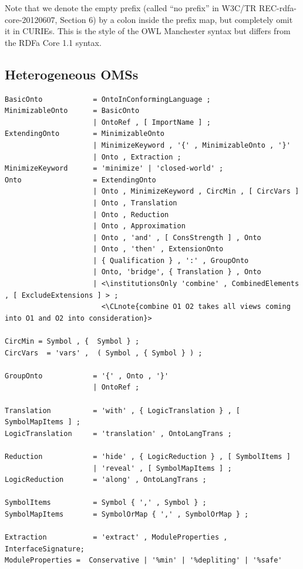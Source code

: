 \documentclass[10pt,%
\ifpretendfinal
final%
\else
draft%
\fi,
]{scrreprt}
\makeatletter
\newcommand*\CommentAuthor{}
\renewcommand*\CommentAuthor{#1}}
\newcommand*\CommentDate{}
\renewcommand*\CommentDate{#1}}
\newcommand*\CommentId{}
\renewcommand*\CommentId{#1}}
\newcommand*\CommentType{}
\renewcommand*\CommentType{#1}}
\newcommand*{\SetCommentColorByType}[1]{%
\edef\localType{{#1}}%
\expandafter\ifstrequal\localType{q-aut}{\colorlet{CommentColor}{red}}{%
\expandafter\ifstrequal\localType{q-all}{\colorlet{CommentColor}{orange}}{%
\expandafter\ifstrequal\localType{todo}{\colorlet{CommentColor}{orange}}{%
\expandafter\ifstrequal\localType{fyi}{\colorlet{CommentColor}{lightgray}}{%
\colorlet{CommentColor}{yellow}}}}}}
\newcommand*{\SetCommentPrefixByType}[1]{%
\edef\localType{{#1}}%
\expandafter\@ifmtarg\localType{%
\edef\CommentPrefix{}%
}{%
\caseupper[q]{#1}%
\edef\CommentPrefix{\thestring: }%
}}
\newcommand*{\initComment}[1]{%
\setkeys{Comment}{#1}%
\SetCommentColorByType{\CommentType}%
\relax%
\SetCommentPrefixByType{\CommentType}%
\relax%
}
\newcommand*{\todonote}[2][]{%
\initComment{#1}%
\pdfcomment[author=\CommentAuthor,color=CommentColor,date=\CommentDate,id=\CommentId]{%
\CommentPrefix
#2}}
\renewcommand*{\todonote}[2][]{%
\initComment{#1}%
\ednote{\CommentPrefix #2}}
\newcommand*{\CLnote}[2][author=Christoph Lange]{%
\todonote[author=Christoph Lange,#1]{#2} 
}
\newcommand*{\institutionsOnly}{\bfseries\itshape}
\newcommand{\ssclause}[1]{\subsection{#1}}
\newcommand{\nisref}[1]{#1}
\makeatother
\begin{document}
Note that we denote the empty prefix (called ``no prefix'' in \nisref{W3C/TR REC-rdfa-core-20120607, Section 6}) by a colon inside the prefix map, but completely omit it in CURIEs.  This is the style of the OWL Manchester syntax \cite{W3C:NOTE-owl2-manchester-syntax-20091027} but differs from the RDFa Core 1.1 syntax.

\ssclause{Heterogeneous OMSs}\label{a:dol-text:OMSs}


\begin{lstlisting}[language=ebnf,escapeinside={<>}]
BasicOnto            = OntoInConformingLanguage ;
MinimizableOnto      = BasicOnto
                     | OntoRef , [ ImportName ] ; 
ExtendingOnto        = MinimizableOnto
                     | MinimizeKeyword , '{' , MinimizableOnto , '}' 
                     | Onto , Extraction ;
MinimizeKeyword      = 'minimize' | 'closed-world' ;
Onto                 = ExtendingOnto
                     | Onto , MinimizeKeyword , CircMin , [ CircVars ]
                     | Onto , Translation
                     | Onto , Reduction
                     | Onto , Approximation
                     | Onto , 'and' , [ ConsStrength ] , Onto 
                     | Onto , 'then' , ExtensionOnto
                     | { Qualification } , ':' , GroupOnto
                     | Onto, 'bridge', { Translation } , Onto
                     | <\institutionsOnly 'combine' , CombinedElements , [ ExcludeExtensions ] > ;
                       <\CLnote{combine O1 O2 takes all views coming into O1 and O2 into consideration}>

CircMin = Symbol , {  Symbol } ;
CircVars  = 'vars' ,  ( Symbol , { Symbol } ) ;

GroupOnto            = '{' , Onto , '}'
                     | OntoRef ;

Translation          = 'with' , { LogicTranslation } , [ SymbolMapItems ] ;
LogicTranslation     = 'translation' , OntoLangTrans ;
                      
Reduction            = 'hide' , { LogicReduction } , [ SymbolItems ]
                     | 'reveal' , [ SymbolMapItems ] ;
LogicReduction       = 'along' , OntoLangTrans ;

SymbolItems          = Symbol { ',' , Symbol } ;
SymbolMapItems       = SymbolOrMap { ',' , SymbolOrMap } ;

Extraction           = 'extract' , ModuleProperties , InterfaceSignature;
ModuleProperties =  Conservative | '%min' | '%depliting' | '%safe'  


\end{lstlisting}
\end{document}
